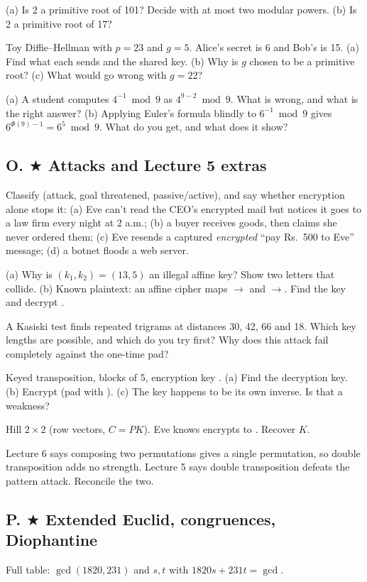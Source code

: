 \q (a) Is 2 a primitive root of 101? Decide with at most two modular powers. (b) Is 2 a primitive root of 17?

\q Toy Diffie--Hellman with $p = 23$ and $g = 5$. Alice's secret is 6 and Bob's is 15.
(a) Find what each sends and the shared key. (b) Why is $g$ chosen to be a primitive root? (c) What would go wrong with $g = 22$?

\q (a) A student computes $4^{-1} \bmod 9$ as $4^{9-2} \bmod 9$. What is wrong, and what is the right answer?
(b) Applying Euler's formula blindly to $6^{-1} \bmod 9$ gives $6^{\Phi(9) - 1} = 6^5 \bmod 9$. What do you get, and what does it show?

\subsection*{O. $\bigstar$ Attacks and Lecture 5 extras}
\q Classify (attack, goal threatened, passive/active), and say whether encryption alone stops it: (a) Eve can't read the CEO's encrypted mail but notices it goes to a law firm every night at 2 a.m.; (b) a buyer receives goods, then claims she never ordered them; (c) Eve resends a captured \emph{encrypted} ``pay Rs.~500 to Eve'' message; (d) a botnet floods a web server.

\q (a) Why is $(k_1, k_2) = (13, 5)$ an illegal affine key? Show two letters that collide. (b) Known plaintext: an affine cipher maps $\to$ and $\to$. Find the key and decrypt .

\q A Kasiski test finds repeated trigrams at distances 30, 42, 66 and 18. Which key lengths are possible, and which do you try first? Why does this attack fail completely against the one-time pad?

\q Keyed transposition, blocks of 5, encryption key . (a) Find the decryption key. (b) Encrypt  (pad with ). (c) The key happens to be its own inverse. Is that a weakness?

\q Hill $2\times2$ (row vectors, $C = PK$). Eve knows  encrypts to . Recover $K$.

\q Lecture 6 says composing two permutations gives a single permutation, so double transposition adds no strength. Lecture 5 says double transposition defeats the pattern attack. Reconcile the two.

\subsection*{P. $\bigstar$ Extended Euclid, congruences, Diophantine}
\q Full table: $\gcd(1820, 231)$ and $s, t$ with $1820s + 231t = \gcd$.


